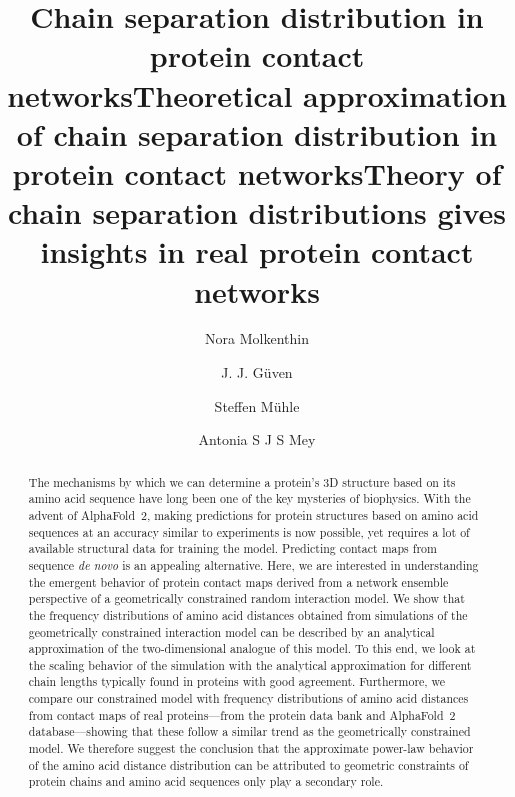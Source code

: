 \documentclass[
reprint,
twocolumn,
amsmath,amssymb,superscriptaddress,aps,
pre]{revtex4-1}
\begin{document}
\title{Chain separation distribution in protein contact networks}
\title{Theoretical approximation of chain separation distribution in protein contact networks}
\title{Theory of chain separation distributions gives insights in real protein contact networks}
\author{Nora Molkenthin}
\author{J. J.  Güven}
\author{Steffen Mühle}
\author{Antonia S J S Mey}

\begin{abstract}
The mechanisms by which we can determine a protein's 3D structure based on its amino acid sequence have long been one of the key mysteries of biophysics. With the advent of AlphaFold~2, making predictions for protein structures based on amino acid sequences at an accuracy similar to experiments is now possible, yet requires a lot of available structural data for training the model. Predicting contact maps from sequence \textit{de novo} is an appealing alternative. Here, we are interested in understanding the emergent behavior of protein contact maps derived from a network ensemble perspective of a geometrically constrained random interaction model. We show that the frequency distributions of amino acid distances obtained from simulations of the geometrically constrained interaction model can be described by an analytical approximation of the two-dimensional analogue of this model. To this end, we look at the scaling behavior of the simulation with the analytical approximation for different chain lengths typically found in proteins with good agreement. Furthermore, we compare our constrained model with frequency distributions of amino acid distances from contact maps of real proteins---from the protein data bank and AlphaFold~2 database---showing that these follow a similar trend as the geometrically constrained model.   
 We therefore suggest the conclusion that the approximate power-law behavior of the amino acid distance distribution can be attributed to geometric constraints of protein chains and amino acid sequences only play a secondary role.  
\end{abstract}
\maketitle
\end{document}
